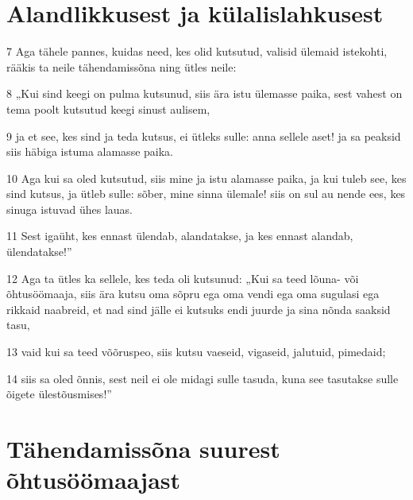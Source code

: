 \section*{Alandlikkusest ja külalislahkusest}

\par 7 Aga tähele pannes, kuidas need, kes olid kutsutud, valisid ülemaid istekohti, rääkis ta neile tähendamissõna ning ütles neile:
\par 8 „Kui sind keegi on pulma kutsunud, siis ära istu ülemasse paika, sest vahest on tema poolt kutsutud keegi sinust aulisem,
\par 9 ja et see, kes sind ja teda kutsus, ei ütleks sulle: anna sellele aset! ja sa peaksid siis häbiga istuma alamasse paika.
\par 10 Aga kui sa oled kutsutud, siis mine ja istu alamasse paika, ja kui tuleb see, kes sind kutsus, ja ütleb sulle: sõber, mine sinna ülemale! siis on sul au nende ees, kes sinuga istuvad ühes lauas.
\par 11 Sest igaüht, kes ennast ülendab, alandatakse, ja kes ennast alandab, ülendatakse!”
\par 12 Aga ta ütles ka sellele, kes teda oli kutsunud: „Kui sa teed lõuna- või õhtusöömaaja, siis ära kutsu oma sõpru ega oma vendi ega oma sugulasi ega rikkaid naabreid, et nad sind jälle ei kutsuks endi juurde ja sina nõnda saaksid tasu,
\par 13 vaid kui sa teed võõruspeo, siis kutsu vaeseid, vigaseid, jalutuid, pimedaid;
\par 14 siis sa oled õnnis, sest neil ei ole midagi sulle tasuda, kuna see tasutakse sulle õigete ülestõusmises!”

\section*{Tähendamissõna suurest õhtusöömaajast}

